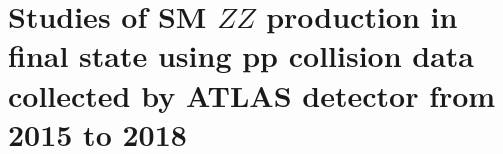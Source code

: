 \chapter{Studies of SM $ZZ$ production in \llll final state using pp collision data collected by ATLAS detector from 2015 to 2018}










\clearpage

